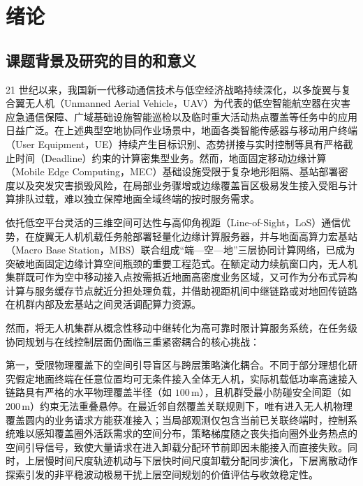 \chapter{绪论}
\label{cha:introduction}

\section{课题背景及研究的目的和意义}
\label{sec:background}

21 世纪以来，我国新一代移动通信技术与低空经济战略持续深化，以多旋翼与复合翼无人机（Unmanned Aerial Vehicle，UAV）为代表的低空智能航空器在灾害应急通信保障、广域基础设施智能巡检以及临时重大活动热点覆盖等任务中的应用日益广泛\cite{chung2018swarm,zeng2016wireless}。在上述典型空地协同作业场景中，地面各类智能传感器与移动用户终端（User Equipment，UE）持续产生目标识别、态势拼接与实时控制等具有严格截止时间（Deadline）约束的计算密集型业务\cite{mao2017survey,shi2016edge}。然而，地面固定移动边缘计算（Mobile Edge Computing，MEC）基础设施受限于复杂地形阻隔、基站部署密度以及突发灾害损毁风险，在局部业务骤增或边缘覆盖盲区极易发生接入受阻与计算排队过载，难以独立保障地面全域终端的按时服务需求\cite{abbas2018mobile,wang2020edge}。

依托低空平台灵活的三维空间可达性与高仰角视距（Line-of-Sight，LoS）通信优势，在旋翼无人机机载任务舱部署轻量化边缘计算服务器，并与地面高算力宏基站（Macro Base Station，MBS）联合组成“端—空—地”三层协同计算网络，已成为突破地面固定边缘计算空间瓶颈的重要工程范式\cite{mozaffari2019tutorial,hu2019uav,yu2020joint}。在额定动力续航窗口内，无人机集群既可作为空中移动接入点按需抵近地面高密度业务区域，又可作为分布式异构计算与服务缓存节点就近分担处理负载，并借助视距机间中继链路或对地回传链路在机群内部及宏基站之间灵活调配算力资源\cite{huang2020deep,khurshid2021uav,zeng2026uav,wang2026ccah}。

然而，将无人机集群从概念性移动中继转化为高可靠时限计算服务系统，在任务级协同规划与在线控制层面仍面临三重紧密耦合的核心挑战：

第一，受限物理覆盖下的空间引导盲区与跨层策略演化耦合。不同于部分理想化研究假定地面终端在任意位置均可无条件接入全体无人机，实际机载低功率高速接入链路具有严格的水平物理覆盖半径（如 $100\,\mathrm{m}$），且机群受最小防碰安全间距（如 $200\,\mathrm{m}$）约束无法重叠悬停。在最近邻自然覆盖关联规则下，唯有进入无人机物理覆盖圆内的业务请求方能获准接入；当局部观测仅包含当前已关联终端时，控制系统难以感知覆盖圈外活跃需求的空间分布，策略梯度随之丧失指向圈外业务热点的空间引导信号，致使大量请求在进入卸载分配环节前即因未能接入而直接失败。同时，上层慢时间尺度轨迹机动与下层快时间尺度卸载分配同步演化，下层离散动作探索引发的非平稳波动极易干扰上层空间规划的价值评估与收敛稳定性。


